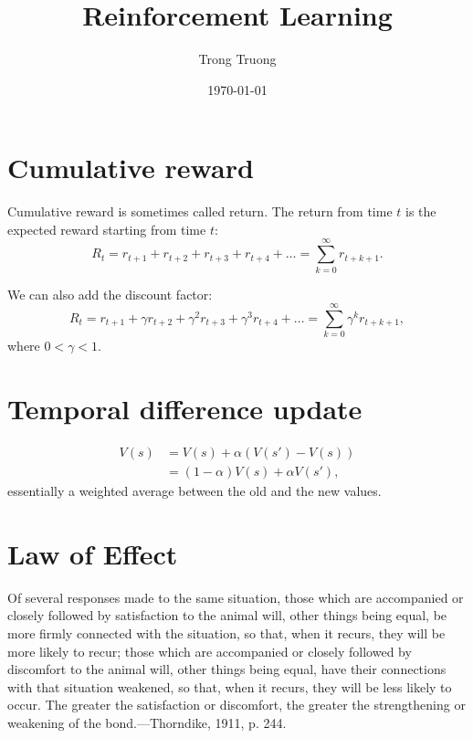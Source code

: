 \documentclass[12pt]{article}
\title{Reinforcement Learning}
\author{Trong Truong}
\date{\today}
\theoremstyle{plain}
\theoremstyle{definition}
\theoremstyle{remark}
\begin{document}
\sloppy
\maketitle

\tableofcontents

\section{Cumulative reward}


Cumulative reward is sometimes called return. The return from time \( t \) is the expected reward starting from time \( t \):
\[
R _ { t } = r _ { t + 1 } + r _ { t + 2 } + r _ { t + 3 } + r _ { t + 4 } + \ldots = \sum _ { k = 0 } ^ { \infty } r _ { t + k + 1 }.
\]

We can also add the discount factor:
\[
R _ { t } = r _ { t + 1 } + \gamma r _ { t + 2 } + \gamma ^ { 2 } r _ { t + 3 } + \gamma ^ { 3 } r _ { t + 4 } + \ldots = \sum _ { k = 0 } ^ { \infty } \gamma ^ { k } r _ { t + k + 1 },
\]
where \( 0 < \gamma < 1. \)

\section{Temporal difference update}

\begin{align*}
V(s) &= V(s) + \alpha (V(s') - V(s)) \\
     &= (1 - \alpha) V(s) + \alpha V(s'),
\end{align*}
essentially a weighted average between the old and the new values.

\section{Law of Effect}

Of several responses made to the same situation,  those which are accompanied or closely followed by satisfaction to the animal will, other things being equal, be more firmly connected with the situation, so that, when it recurs, they will be more likely to recur; those which are accompanied or closely followed by discomfort to the animal will, other things being equal, have their connections with that situation weakened, so that, when it recurs, they will be less likely to occur.  The greater the satisfaction or discomfort, the greater the strengthening or weakening of the bond.---Thorndike, 1911, p. 244.
\end{document}
